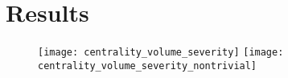 \section{Results}


\begin{figure}[h]
\texttt{[image: centrality\_volume\_severity]}
\texttt{[image: centrality\_volume\_severity\_nontrivial]}
\end{figure}
